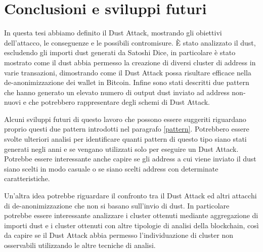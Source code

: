 \chapter{Conclusioni e sviluppi futuri}
In questa tesi abbiamo definito il Dust Attack, mostrando gli obiettivi dell'attacco, le conseguenze e le possibili contromisure. È stato analizzato il dust, escludendo gli importi dust generati da Satoshi Dice, in particolare è stato mostrato come il dust abbia permesso la creazione di diversi cluster di address in varie transazioni, dimostrando come il Dust Attack possa risultare efficace nella de-anonimizzazione dei wallet in Bitcoin. Infine sono stati descritti due pattern che hanno generato un elevato numero di output dust inviato ad address non-nuovi e che potrebbero rappresentare degli schemi di Dust Attack. 

Alcuni sviluppi futuri di questo lavoro che possono essere suggeriti riguardano proprio questi due pattern introdotti nel paragrafo \ref{pattern}. Potrebbero essere svolte ulteriori analisi per identificare quanti pattern di questo tipo siano stati generati negli anni e se vengano utilizzati solo per eseguire un Dust Attack. Potrebbe essere interessante anche capire se gli address a cui viene inviato il dust siano scelti in modo casuale o se siano scelti address con determinate caratteristiche. 

Un'altra idea potrebbe riguardare il confronto tra il Dust Attack ed altri attacchi di de-anonimizzazione che non si basano sull'invio di dust. In particolare potrebbe essere interessante analizzare i cluster ottenuti mediante aggregazione di importi dust e i cluster ottenuti con altre tipologie di analisi della blockchain, così da capire se il Dust Attack abbia permesso l'individuazione di cluster non osservabili utilizzando le altre tecniche di analisi.